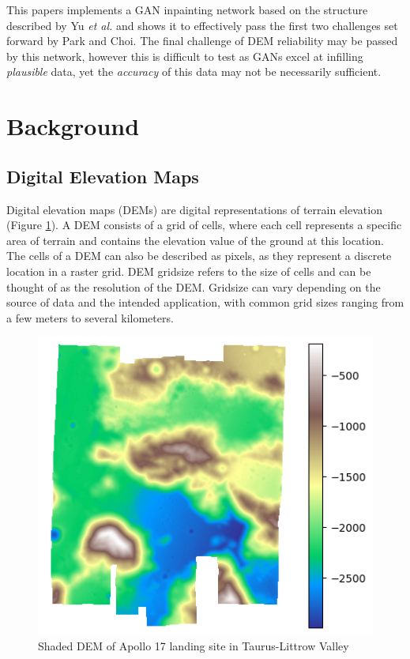 \documentclass[twocolumn]{article}
\begin{document}
This papers implements a GAN inpainting network based on the structure described by Yu \emph{et al.}\autocite{yuGenerativeImageInpainting2018} and shows it to effectively pass the first two challenges set forward by Park and Choi\autocite{parkNeuralProcessApproach2021}.
The final challenge of DEM reliability may be passed by this network, however this is difficult to test as GANs excel at infilling \emph{plausible} data, yet the \emph{accuracy} of this data may not be necessarily sufficient.

\section{Background}
\label{sec:org14c843c}
\subsection{Digital Elevation Maps}
\label{sec:org7c703fd}

Digital elevation maps (DEMs) are digital representations of terrain elevation (Figure \ref{fig:apollo_17}).
A DEM consists of a grid of cells, where each cell represents a specific area of terrain and contains the elevation value of the ground at this location.
The cells of a DEM can also be described as pixels, as they represent a discrete location in a raster grid.
DEM gridsize refers to the size of cells and can be thought of as the resolution of the DEM.
Gridsize can vary depending on the source of data and the intended application, with common grid sizes ranging from a few meters to several kilometers.

\begin{figure}[htbp]
\centering
\includegraphics[width=.9\linewidth]{images/apollo_17.png}
\caption{\label{fig:apollo_17}Shaded DEM of Apollo 17 landing site in Taurus-Littrow Valley}
\end{figure}
\end{document}
